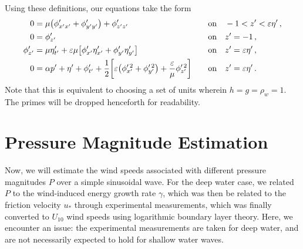 \documentclass{jfm}
\let\Oldsection\section
\renewcommand{\section}{\FloatBarrier\Oldsection}
\renewcommand*{\epsilon}{\varepsilon}
\begin{document}
Using these definitions, our equations take the form
\begin{alignat}{2}
  0 &= \mu \pqty{\phi'_{x'x'} + \phi'_{y'y'}} + \phi'_{z'z'} &&\qq{on}
    -1 < z' < \epsilon \eta' \,, \label{eq:laplace_nondim} \\
  0 &= \phi'_{z'} &&\qq{on} z'=-1 \,, \label{eq:bottom_bc_nondim} \\
  \phi'_{z'} &= \mu \eta'_{t'} +
    \epsilon \mu \bqty{\phi'_{x'} \eta'_{x'} + \phi'_{y'} \eta'_{y'}}
    &&\qq{on} z' = \epsilon \eta' \,, \label{eq:kinematic_bc_nondim} \\
  0 &= \alpha p' +  \eta' + \phi'_{t'} + \frac{1}{2}
    \bqty{\epsilon \pqty{\phi_{x'}^{\prime \, 2} + \phi_{y'}^{\prime \,
    2}} +  \frac{\epsilon}{\mu} \phi_{z'}^{\prime \, 2}} &&\qq{on} z'=
    \epsilon \eta' \,.  \label{eq:dynamic_bc_nondim}
\end{alignat}
Note that this is equivalent to choosing a set of units wherein $h = g =
\rho_w = 1$.
The primes will be dropped henceforth for readability.

\section{Pressure Magnitude Estimation}
Now, we will estimate the wind speeds associated with different pressure
magnitudes $P$ over a simple sinusoidal wave.
For the deep water case, we related $P$ to the wind-induced energy growth
rate $\gamma$, which was then be related to the friction velocity $u_*$
through experimental measurements, which was finally converted to
$U_{10}$ wind speeds using logarithmic boundary layer theory.
Here, we encounter an issue: the experimental measurements are taken for
deep water, and are not necessarily expected to hold for shallow water
waves.
\end{document}
